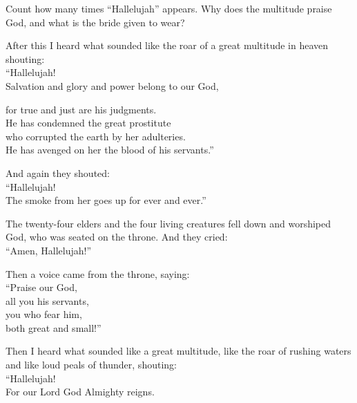 \begin{ScriptureBox2}{Count how many times ``Hallelujah'' appears. Why does the multitude praise God, and what is the bride given to wear?}

\item[19:1] After this I heard what sounded like the roar of a great multitude in heaven shouting:\\
\hspace*{1em}``Hallelujah!\\
\hspace*{1em}Salvation and glory and power belong to our God,

\item[19:2] \hspace*{2em}for true and just are his judgments.\\
\hspace*{1em}He has condemned the great prostitute\\
\hspace*{2em}who corrupted the earth by her adulteries.\\
\hspace*{1em}He has avenged on her the blood of his servants.''

\item[19:3] And again they shouted:\\
\hspace*{1em}``Hallelujah!\\
\hspace*{1em}The smoke from her goes up for ever and ever.''

\item[19:4] The twenty-four elders and the four living creatures fell down and worshiped God, who was seated on the throne. And they cried:\\
\hspace*{1em}``Amen, Hallelujah!''

\item[19:5] Then a voice came from the throne, saying:\\
\hspace*{1em}``Praise our God,\\
\hspace*{2em}all you his servants,\\
\hspace*{1em}you who fear him,\\
\hspace*{2em}both great and small!''

\item[19:6] Then I heard what sounded like a great multitude, like the roar of rushing waters and like loud peals of thunder, shouting:\\
\hspace*{1em}``Hallelujah!\\
\hspace*{2em}For our Lord God Almighty reigns.


\end{ScriptureBox2}

